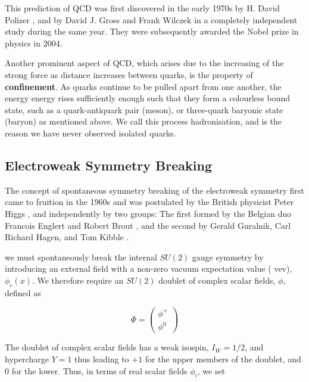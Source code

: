This prediction of QCD was first discovered in the early 1970s by H. David Polizer \cite{PhysRevLett.30.1346}, and by David J. Gross and Frank 
Wilczek \cite{PhysRevD.8.3633} in a completely independent study during the same year. They were subsequently awarded the Nobel prize in 
physics in 2004.

Another prominent aspect of QCD, which arises due to the increasing of the strong force as distance increases between quarks, is the property 
of \textbf{confinement}. As quarks continue to be pulled apart from one another, the energy energy rises sufficiently enough such that they 
form a colourless bound state, such as a quark-antiquark pair (meson), or three-quark baryonic state (baryon) as mentioned above. We call this 
process hadronisation, and is the reason we have never observed isolated quarks.  


\subsection{Electroweak Symmetry Breaking} \label{subsec-ElectroweakSymmetryBreaking}

The concept of spontaneous symmetry breaking of the electroweak symmetry first came to fruition in the 1960s and was postulated by the British 
physicist Peter Higgs \cite{PhysRevLett.13.508}, and independently by two groups: The first formed by the Belgian duo Francois Englert and 
Robert Brout \cite{PhysRevLett.13.321}, and the second by Gerald Guralnik, Carl Richard Hagen, and Tom Kibble \cite{PhysRevLett.13.585}.

we must spontaneously break the internal $SU(2)$ gauge symmetry by introducing an external field with a non-zero vacuum expectation value (
vev), $\phi_c(x)$. We therefore require an $SU(2)$ doublet of complex scalar fields, $\phi$, defined as

\begin{equation}
\Phi
= 
\begin{pmatrix}
\phi^+ \\
\phi^0
\end{pmatrix}
\end{equation}

The doublet of complex scalar fields has a weak isospin, $I_W = 1/2$, and hypercharge $Y = 1$ thus leading to $+1$ for the upper members of the doublet, and 0 for the lower. Thus, in terms of real scalar fields $\phi_i$, we set

